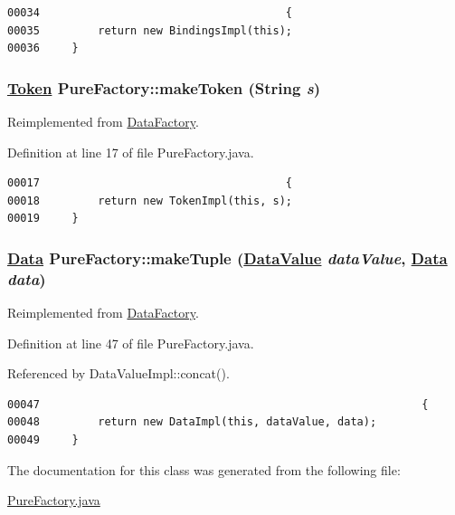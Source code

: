 \footnotesize\begin{verbatim}00034                                      {
00035         return new BindingsImpl(this);
00036     }
\end{verbatim}\normalsize 
\hypertarget{classPureFactory_a2}{
\subsubsection[makeToken]{\setlength{\rightskip}{0pt plus 5cm}\hyperlink{interfaceToken}{Token} Pure\-Factory::make\-Token (String {\em s})}}
\label{classPureFactory_a2}




Reimplemented from \hyperlink{interfaceDataFactory_a3}{Data\-Factory}.

Definition at line 17 of file Pure\-Factory.java.\footnotesize\begin{verbatim}00017                                      {
00018         return new TokenImpl(this, s);
00019     }
\end{verbatim}\normalsize 
\hypertarget{classPureFactory_a11}{
\subsubsection[makeTuple]{\setlength{\rightskip}{0pt plus 5cm}\hyperlink{interfaceData}{Data} Pure\-Factory::make\-Tuple (\hyperlink{interfaceDataValue}{Data\-Value} {\em data\-Value}, \hyperlink{interfaceData}{Data} {\em data})}}
\label{classPureFactory_a11}




Reimplemented from \hyperlink{interfaceDataFactory_a1}{Data\-Factory}.

Definition at line 47 of file Pure\-Factory.java.

Referenced by Data\-Value\-Impl::concat().

\footnotesize\begin{verbatim}00047                                                           {
00048         return new DataImpl(this, dataValue, data);
00049     }
\end{verbatim}\normalsize 


The documentation for this class was generated from the following file:\begin{CompactItemize}
\item 
\hyperlink{PureFactory_8java-source}{Pure\-Factory.java}\end{CompactItemize}
